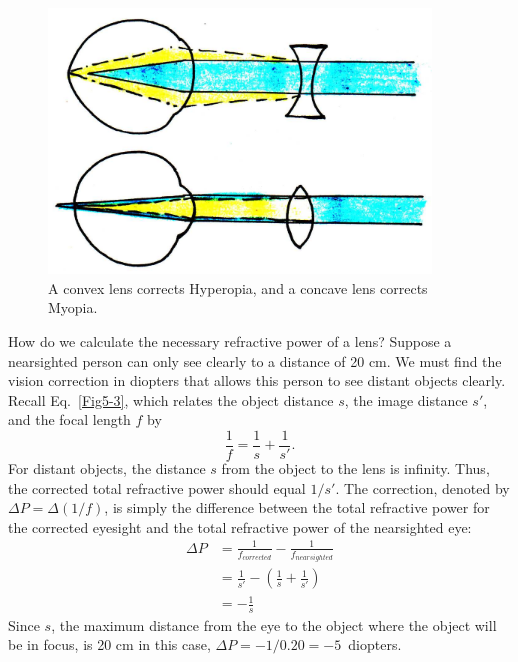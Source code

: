 \begin{figure}[h]
	\centering
	\includegraphics[width=4.0in]{./figures/Topic5/Fig5-17.jpg}
	\caption{A convex lens corrects Hyperopia, and a concave lens corrects Myopia.}
	\label{Fig5-17}
\end{figure}

How do we calculate the necessary refractive power of a lens?  Suppose a nearsighted person can only see clearly to a distance of 20 cm.  We must find the vision correction in diopters that allows this person to see distant objects clearly.  Recall Eq.~\ref{Fig5-3}, which relates the object distance $s$, the image distance $s'$, and the focal length $f$ by 
$$\frac{1}{f}=\frac{1}{s}+\frac{1}{s'}.$$
For distant objects, the distance $s$ from the object to the lens is infinity.  Thus, the corrected total refractive power should equal $1/s'$.  The correction, denoted by $\Delta P = \Delta\left(1/f\right)$, is simply the difference between the total refractive power for the corrected eyesight and the total refractive power of the nearsighted eye:
\begin{align}
\Delta P &= \frac{1}{f_{corrected}}-\frac{1}{f_{nearsighted}}\nonumber\\
		&=\frac{1}{s'}-\left(\frac{1}{s}+\frac{1}{s'}\right)\nonumber\\
		&= -\frac{1}{s}\nonumber
\end{align}
Since $s$, the maximum distance from the eye to the object where the object will be in focus, is 20 cm in this case, $\Delta P = -1/0.20 = -5$~diopters.

